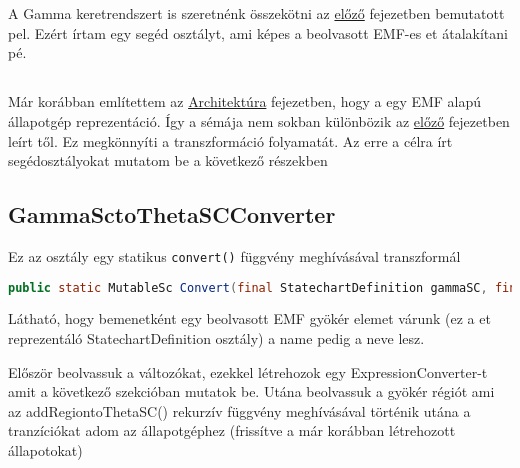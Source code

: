 \chapter{\transzformacio}
\label{sec:transzformacio}

A Gamma keretrendszert is szeretnénk összekötni az \hyperref[sec:thetaleiras]{előző} fejezetben bemutatott {\thetaSc}pel. Ezért írtam egy segéd osztályt, ami képes a beolvasott EMF-es {\gammaSc}et átalakítani {\thetaSc}pé.
\section{{\gammaSc}}
Már korábban említettem az \hyperref[sec:archiutecture]{Architektúra} fejezetben, hogy a {\gammaSc} egy EMF alapú állapotgép reprezentáció. Így a sémája nem sokban különbözik az \hyperref[sec:thetaleiras]{előző} fejezetben leírt {\thetaSc}től. Ez megkönnyíti a transzformáció folyamatát. Az erre a célra írt segédosztályokat mutatom be a következő részekben


\section{GammaSctoThetaSCConverter}

Ez az osztály egy statikus \verb+convert()+ függvény meghívásával transzformál

\begin{lstlisting}[language=java ,breaklines=true]
public static MutableSc Convert(final StatechartDefinition gammaSC, final String name) 
\end{lstlisting}

Látható, hogy bemenetként egy beolvasott EMF gyökér elemet várunk (ez a {\gammaSc}et reprezentáló StatechartDefinition osztály) a name pedig a {\thetaSc} neve lesz.

Először beolvassuk a változókat, ezekkel létrehozok egy ExpressionConverter-t amit a következő szekcióban mutatok be. Utána beolvassuk a gyökér régiót ami az addRegiontoThetaSC() rekurzív függvény meghívásával történik utána a tranzíciókat adom az állapotgéphez (frissítve a már korábban létrehozott állapotokat)

